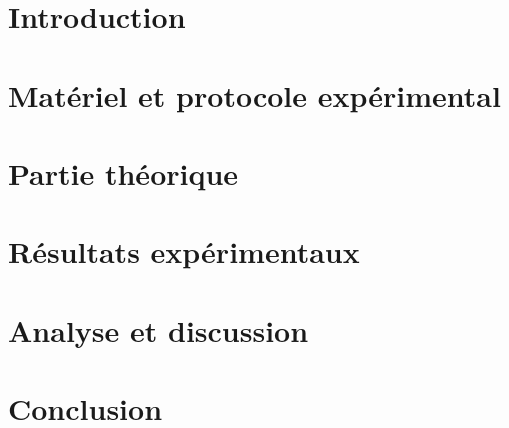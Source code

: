 \documentclass[a4paper,12pt]{article}
\begin{document}


\tableofcontents
\newpage

\section*{Introduction}


\section{Matériel et protocole expérimental}


\section{Partie théorique}


\section{Résultats expérimentaux}


\section{Analyse et discussion}


\section*{Conclusion}

\end{document}
